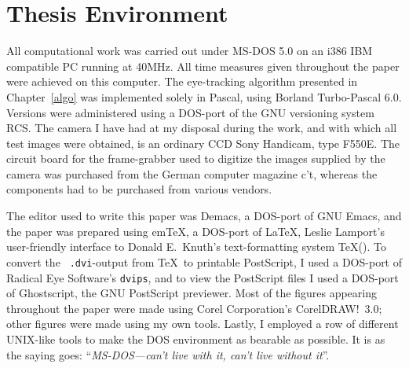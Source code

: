 
\section{Thesis Environment}
\label{intro:env}

All computational work was carried out under MS-DOS 5.0 on an i386 IBM
compatible PC running at 40MHz.  All time measures given throughout
the paper were achieved on this computer.  The eye-tracking algorithm
{\octopus} presented in Chapter~\ref{algo} was implemented solely in
Pascal, using Borland Turbo-Pascal 6.0.  Versions were administered
using a DOS-port of the GNU versioning system RCS.  The camera I have
had at my disposal during the work, and with which all test images
were obtained, is an ordinary CCD Sony Handicam, type F550E.  The
circuit board for the frame-grabber used to digitize the images
supplied by the camera was purchased from the German computer magazine
{\sf c't\/}, whereas the components had to be purchased from various
vendors.

The editor used to write this paper was Demacs, a DOS-port of GNU
Emacs, and the paper was prepared using em\TeX, a DOS-port of \LaTeX,
Leslie Lamport's user-friendly interface to Donald E.\ Knuth's
text-formatting system \TeX (\cite{lamport}).  To convert the {\tt
  .dvi}-output from \TeX\ to printable PostScript, I used a DOS-port
of Radical Eye Software's {\tt dvips}, and to view the PostScript
files I used a DOS-port of Ghostscript, the GNU PostScript previewer.
Most of the figures appearing throughout the paper were made using
Corel Corporation's CorelDRAW!\ 3.0; other figures were made using my
own tools.  Lastly, I employed a row of different UNIX-like tools to
make the DOS environment as bearable as possible.  It is as the saying
goes: ``{\em MS-DOS---can't live with it, can't live without it\/}''.
